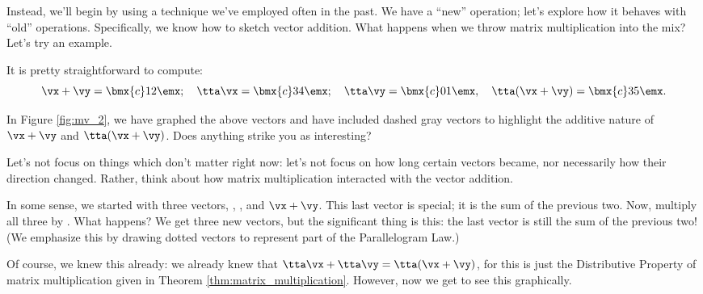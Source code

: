 Instead, we'll begin by using a technique we've employed often in the past. We have a ``new'' operation; let's explore how it behaves with ``old'' operations. Specifically, we know how to sketch vector addition. What happens when we throw matrix multiplication into the mix? Let's try an example.

\medskip

{It is pretty straightforward to compute: 
\[
\vx+\vy = \bmx{c} 1\\2\emx;\quad \tta\vx = \bmx{c}3\\4\emx; \quad \tta\vy = \bmx{c} 0\\1\emx,\quad \tta(\vx+\vy) = \bmx{c} 3\\5\emx.
\]

In Figure \ref{fig:mv_2}, we have graphed the above vectors and have included dashed gray vectors to highlight the additive nature of $\vx+\vy$ and $\tta(\vx+\vy)$. Does anything strike you as interesting?

\begin{myfigure}%
\begin{center}
\end{center}
\label{fig:mv_2}
\end{myfigure}%

Let's not focus on things which don't matter right now: let's not focus on how long certain vectors became, nor necessarily how their direction changed. Rather, think about how matrix multiplication interacted with the vector addition.

In some sense, we started with three vectors, \vx, \vy, and $\vx+\vy$. This last vector is special; it is the sum of the previous two. Now, multiply all three by \tta. What happens? We get three new vectors, but the significant thing is this: the last vector is still the sum of the previous two! (We emphasize this by drawing dotted vectors to represent part of the Parallelogram Law.)

Of course, we knew this already: we already knew that $\tta\vx + \tta\vy = \tta(\vx+\vy)$, for this is just the Distributive Property of matrix multiplication given in Theorem \ref{thm:matrix_multiplication}. However, now we get to see this graphically.}

